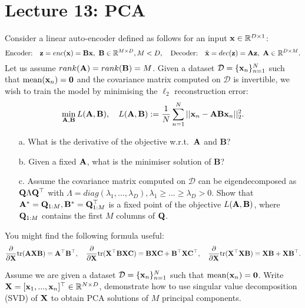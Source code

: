\section{Lecture 13: PCA}

\newcommand{\BB}{\mathbf B}
\newcommand{\BX}{\mathbf X}
\newcommand{\BC}{\mathbf C}
\newcommand{\BU}{\mathbf U}
\newcommand{\BW}{\mathbf W}

\begin{question}
\label{q:pca_vs_linear_autoencoder}
Consider a linear auto-encoder defined as follows for an input $\mathbf{x} \in \mathbb{R}^{D \times 1}$:
$$\text{Encoder:} \quad \z = enc(\x) = \BB \x, \ \BB \in \mathbb{R}^{M \times D}, M < D, \quad \text{Decoder:} \quad \hat{\x} = dec(\z) = \BA \z, \ \BA \in \mathbb{R}^{D \times M}.$$
Let us assume $rank(\BA) = rank(\BB) = M$.
Given a dataset $\mathcal{D} = \{ \mathbf{x}_n \}_{n=1}^N$ such that $\text{mean}(\mathbf{x}_n) = \bm{0}$ and the covariance matrix computed on $\mathcal{D}$ is invertible, we wish to train the model by minimising the $\ell_2$ reconstruction error:
$$\min_{\BA, \BB} L(\BA, \BB), \quad L(\BA, \BB) := \frac{1}{N} \sum_{n=1}^N || \x_n - \BA \BB \x_n ||_2^2.$$
%
\begin{itemize}
\item[a.] What is the derivative of the objective w.r.t.~$\mathbf A$ and $\BB$?
\item[b.] Given a fixed $\mathbf A$, what is the minimiser solution of $\BB$?
\item[c.] Assume the covariance matrix computed on $\mathcal{D}$ can be eigendecomposed as $\mathbf{Q} \Lambda \mathbf{Q}^\top$ with $\Lambda = diag(\lambda_1, ..., \lambda_D), \lambda_1 \geq ... \geq \lambda_D > 0$. Show that $\BA^* = \BQ_{1:M}, \BB^* = \BQ_{1:M}^{\top}$ is a fixed point of the objective $L(\BA, \BB)$, where $\mathbf{Q}_{1:M}$ contains the first $M$ columns of $\mathbf{Q}$.
\end{itemize}
%
You might find the following formula useful:
$$\frac{\partial}{\partial \BX} \tr(\BA \BX \BB) = \BA^\top \BB^\top, \quad \frac{\partial}{\partial \BX} \tr(\BX^\top \BB \BX \BC) = \BB \BX \BC + \BB^\top \BX \BC^\top, \quad \frac{\partial}{\partial \BX} \tr(\BX^\top \BX \BB) = \BX \BB + \BX \BB^\top.$$

\end{question}


\begin{question}
\label{q:svd_and_pca}
Assume we are given a dataset $\mathcal{D} = \{ \mathbf{x}_n \}_{n=1}^N$ such that $\text{mean}(\mathbf{x}_n) = \bm{0}$. Write $\BX = [\x_1, ..., \x_n]^\top \in \mathbb{R}^{N \times D}$, demonstrate how to use singular value decomposition (SVD) of $\mathbf{X}$ to obtain PCA solutions of $M$ principal components.  
\end{question}


